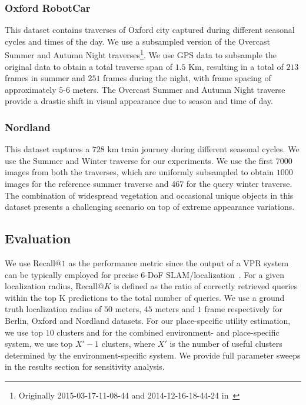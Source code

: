 \documentclass[letterpaper, 10 pt, conference]{ieeeconf}  \fi
\begin{document}
\subsubsection{Oxford RobotCar} This dataset contains traverses of Oxford city captured during different seasonal cycles and times of the day. We use a subsampled version of the Overcast Summer and Autumn Night traverses\footnote{Originally 2015-03-17-11-08-44 and 2014-12-16-18-44-24 in~\cite{maddern20171}}. We use GPS data to subsample the original data to obtain a total traverse span of $1.5$ Km, resulting in a total of $213$ frames in summer and $251$ frames during the night, with frame spacing of approximately $5$-$6$ meters. The Overcast Summer and Autumn Night traverse provide a drastic shift in visual appearance due to season and time of day.

\subsubsection{Nordland} This dataset captures a $728$ km train journey during different seasonal cycles. We use the Summer and Winter traverse for our experiments. We use the first $7000$ images from both the traverses, which are uniformly subsampled to obtain $1000$ images for the reference summer traverse and $467$ for the query winter traverse. The combination of widespread vegetation and occasional unique objects in this dataset presents a challenging scenario on top of extreme appearance variations.

\subsection{Evaluation}
\label{sec:Metric}
We use Recall$@1$ as the performance metric since the output of a VPR system can be typically employed for precise 6-DoF SLAM/localization~\cite{zaffar2021vpr}. For a given localization radius, Recall$@K$ is defined as the ratio of correctly retrieved queries within the top K predictions to the total number of queries. We use a ground truth localization radius of $50$ meters, $45$ meters and $1$ frame respectively for Berlin, Oxford and Nordland datasets. For our place-specific utility estimation, we use top $10$ clusters and for the combined environment- and place-specific system, we use top $X'-1$ clusters, where $X'$ is the number of useful clusters determined by the environment-specific system. We provide full parameter sweeps in the results section for sensitivity analysis.
\end{document}
